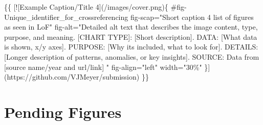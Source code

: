 \documentclass[
  11pt,
  letterpaper,
]{book}
\newenvironment{Shaded}{\begin{snugshade}}{\end{snugshade}}
\newcommand{\CommentTok}[1]{\textcolor[rgb]{0.37,0.37,0.37}{#1}}
\newcommand{\NormalTok}[1]{\textcolor[rgb]{0.00,0.23,0.31}{#1}}
\newcommand{\OtherTok}[1]{\textcolor[rgb]{0.00,0.23,0.31}{#1}}
\begin{document}
\begin{Shaded}
\begin{Highlighting}[]
\NormalTok{\{\{}
\CommentTok{[}\OtherTok{![Example Caption/Title 4}\CommentTok{](/images/cover.png)}\NormalTok{\{}
\NormalTok{    \#fig{-}Unique\_identifier\_for\_crossreferencing}
\NormalTok{    fig{-}scap="Short caption 4 list of figures as seen in LoF"}
\NormalTok{    fig{-}alt="Detailed alt text that describes the image content, type, purpose, and meaning.}
            \OtherTok{[CHART TYPE]: }\CommentTok{[}\OtherTok{Short description}\CommentTok{]}\NormalTok{.}
\NormalTok{                DATA: }\CommentTok{[}\OtherTok{What data is shown, x/y axes}\CommentTok{]}\NormalTok{.}
\NormalTok{                PURPOSE: }\CommentTok{[}\OtherTok{Why it\textquotesingle{}s included, what to look for}\CommentTok{]}\NormalTok{.}
\NormalTok{                DETAILS: }\CommentTok{[}\OtherTok{Longer description of patterns, anomalies, or key insights}\CommentTok{]}\NormalTok{.}
\NormalTok{                SOURCE: Data from }\CommentTok{[}\OtherTok{source name/year and url/link}\CommentTok{]}
\NormalTok{            "}
\NormalTok{    fig{-}align="left"}
\NormalTok{    width="30\%"}
\NormalTok{    \}](https://github.com/VJMeyer/submission)}
\NormalTok{\}\}}
\end{Highlighting}
\end{Shaded}

\section{Pending Figures}\label{pending-figures}
\end{document}
